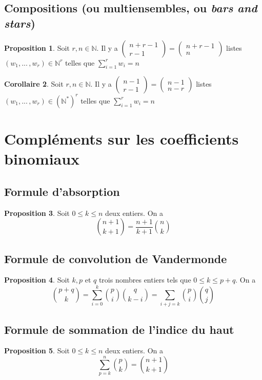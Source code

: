 \documentclass[10pt,a4paper]{article}
\theoremstyle{definition}
\newtheorem{proposition}{Proposition}[section]
\newtheorem{corollaire}[proposition]{Corollaire}
\begin{document}
\subsection{Compositions (ou multiensembles, ou \textit{bars and stars})}
\begin{proposition}
Soit $r, n \in \mathbb{N}$. Il y a $\begin{pmatrix}
n + r - 1 \\
r - 1
\end{pmatrix} = \begin{pmatrix}
n + r - 1 \\
n
\end{pmatrix}$ listes $(w_1, ...\,, w_r) \in \mathbb{N}^r$ telles que $\sum\limits_{i = 1}^r w_i = n$
\end{proposition}
\begin{corollaire}
Soit $r, n \in \mathbb{N}$. Il y a $\begin{pmatrix}
n - 1 \\
r - 1
\end{pmatrix} = \begin{pmatrix}
n - 1 \\
n - r
\end{pmatrix}$ listes $(w_1, ...\,, w_r) \in (\mathbb{N}^*)^r$ telles que $\sum\limits_{i = 1}^r w_i = n$
\end{corollaire}

\section{Compléments sur les coefficients binomiaux}
\subsection{Formule d'absorption}
\begin{proposition}
Soit $0 \leq k \leq n$ deux entiers. On a
\[ \binom{n + 1}{k + 1} = \frac{n + 1}{k + 1} \binom{n}{k} \]
\end{proposition}

\subsection{Formule de convolution de Vandermonde}
\begin{proposition}
Soit $k, p$ et $q$ trois nombres entiers tels que $0 \leq k \leq p + q$. On a
\[ \binom{p + q}{k} = \sum_{i = 0}^k \binom{p}{i} \binom{q}{k - i} = \sum_{i + j = k} \binom{p}{i} \binom{q}{j} \]
\end{proposition}

\subsection{Formule de sommation de l'indice du haut}
\begin{proposition}
Soit $0 \leq k \leq n$ deux entiers. On a
\[ \sum_{p = k}^n \binom{p}{k} = \binom{n + 1}{k + 1} \]
\end{proposition}
\end{document}
